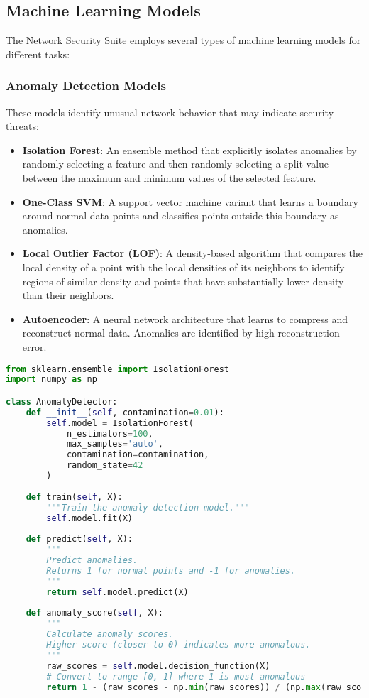 \subsection{Machine Learning Models}
The Network Security Suite employs several types of machine learning models for different tasks:

\subsubsection{Anomaly Detection Models}
These models identify unusual network behavior that may indicate security threats:

\begin{itemize}
    \item \textbf{Isolation Forest}: An ensemble method that explicitly isolates anomalies by randomly selecting a feature and then randomly selecting a split value between the maximum and minimum values of the selected feature.
    
    \item \textbf{One-Class SVM}: A support vector machine variant that learns a boundary around normal data points and classifies points outside this boundary as anomalies.
    
    \item \textbf{Local Outlier Factor (LOF)}: A density-based algorithm that compares the local density of a point with the local densities of its neighbors to identify regions of similar density and points that have substantially lower density than their neighbors.
    
    \item \textbf{Autoencoder}: A neural network architecture that learns to compress and reconstruct normal data. Anomalies are identified by high reconstruction error.
\end{itemize}

\begin{lstlisting}[language=Python, caption=Isolation Forest Implementation]
from sklearn.ensemble import IsolationForest
import numpy as np

class AnomalyDetector:
    def __init__(self, contamination=0.01):
        self.model = IsolationForest(
            n_estimators=100,
            max_samples='auto',
            contamination=contamination,
            random_state=42
        )
        
    def train(self, X):
        """Train the anomaly detection model."""
        self.model.fit(X)
        
    def predict(self, X):
        """
        Predict anomalies.
        Returns 1 for normal points and -1 for anomalies.
        """
        return self.model.predict(X)
        
    def anomaly_score(self, X):
        """
        Calculate anomaly scores.
        Higher score (closer to 0) indicates more anomalous.
        """
        raw_scores = self.model.decision_function(X)
        # Convert to range [0, 1] where 1 is most anomalous
        return 1 - (raw_scores - np.min(raw_scores)) / (np.max(raw_scores) - np.min(raw_scores))
\end{lstlisting}

